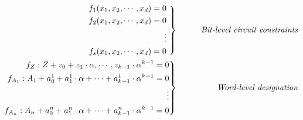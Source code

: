 \begin{eqnarray}
 \left .  \begin{aligned}
f_1(x_1,x_2,\cdots, x_d)=0  \\
f_2(x_1,x_2,\cdots, x_d)=0  \\
\vdots  \\
f_s(x_1,x_2,\cdots, x_d)=0 \\
\end{aligned} 
\ \right\}
 &\qquad&  \text{\it Bit-level circuit constraints} \nonumber \\
 \left . \begin{aligned}
f_{Z}: Z+z_{0}+z_{1}\cdot \alpha,\cdots,{z_{k-1}}\cdot \alpha^{k-1}=0    \\
f_{A_1}:A_1+a_{0}^1+a_{1}^1\cdot \alpha+\cdots+a_{k-1}^1\cdot \alpha^{k-1}=0   \\
\vdots  \\
f_{A_n}:A_n+a_{0}^n+a_{1}^n\cdot \alpha+\cdots+a_{k-1}^n\cdot \alpha^{k-1}=0   \\
\end{aligned} 
\right\}
 &\qquad&  \text{\it Word-level designation} \nonumber \\
\end{eqnarray}


